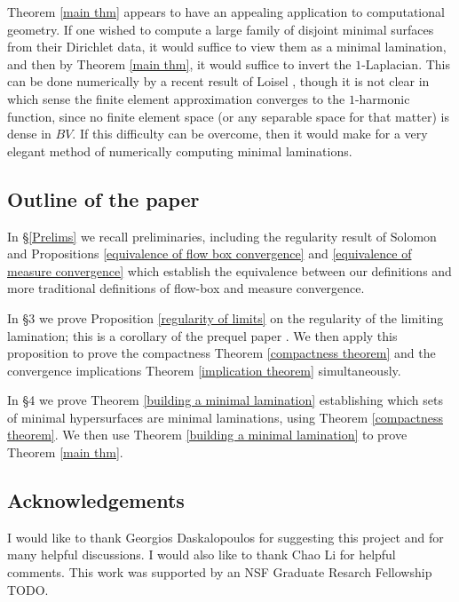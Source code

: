 \documentclass[reqno,11pt]{amsart}
\theoremstyle{definition}
\numberwithin{equation}{section}
\begin{document}
Theorem \ref{main thm} appears to have an appealing application to computational geometry.
If one wished to compute a large family of disjoint minimal surfaces from their Dirichlet data, it would suffice to view them as a minimal lamination, and then by Theorem \ref{main thm}, it would suffice to invert the $1$-Laplacian.
This can be done numerically by a recent result of Loisel \cite{Loisel20}, though it is not clear in which sense the finite element approximation converges to the $1$-harmonic function, since no finite element space (or any separable space for that matter) is dense in $BV$.
If this difficulty can be overcome, then it would make for a very elegant method of numerically computing minimal laminations.

\subsection{Outline of the paper}
In \S\ref{Prelims} we recall preliminaries, including the regularity result of Solomon \cite{Solomon86} and Propositions \ref{equivalence of flow box convergence} and \ref{equivalence of measure convergence} which establish the equivalence between our definitions and more traditional definitions of flow-box and measure convergence.

In \S3 we prove Proposition \ref{regularity of limits} on the regularity of the limiting lamination; this is a corollary of the prequel paper \cite{BackusFLG}.
We then apply this proposition to prove the compactness Theorem \ref{compactness theorem} and the convergence implications Theorem \ref{implication theorem} simultaneously.

In \S4 we prove Theorem \ref{building a minimal lamination} establishing which sets of minimal hypersurfaces are minimal laminations, using Theorem \ref{compactness theorem}.
We then use Theorem \ref{building a minimal lamination} to prove Theorem \ref{main thm}.







\subsection{Acknowledgements}
I would like to thank Georgios Daskalopoulos for suggesting this project and for many helpful discussions.
I would also like to thank Chao Li for helpful comments.
This work was supported by an NSF Graduate Resarch Fellowship TODO.
\end{document}

